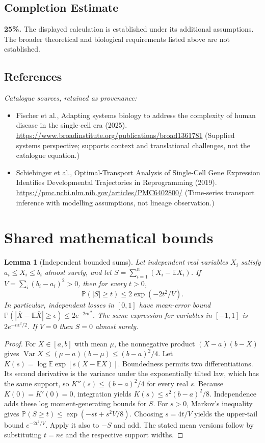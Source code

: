 \documentclass[11pt]{article}
\newcommand{\E}{\mathbb E}
\newcommand{\Prob}{\mathbb P}
\DeclareMathOperator{\Var}{Var}
\providecommand{\E}{\mathbb E}
\providecommand{\Prob}{\mathbb P}
\providecommand{\Var}{\operatorname{Var}}
\newtheorem{sharedlemma}{Lemma}[section]
\begin{document}
\subsection{Completion Estimate}
\textbf{25\%.} The displayed calculation is established under its additional assumptions. The broader theoretical and biological requirements listed above are not established.
\subsection{References}
\noindent\emph{Catalogue sources, retained as provenance:}
\begin{itemize}
\item Fischer et al., Adapting systems biology to address the complexity of human disease in the single-cell era (2025). \url{https://www.broadinstitute.org/publications/broad1361781} (Supplied systems perspective; supports context and translational challenges, not the catalogue equation.)
\item Schiebinger et al., Optimal-Transport Analysis of Single-Cell Gene Expression Identifies Developmental Trajectories in Reprogramming (2019). \url{https://pmc.ncbi.nlm.nih.gov/articles/PMC6402800/} (Time-series transport inference with modelling assumptions, not lineage observation.)
\end{itemize}
\clearpage


\appendix
\section{Shared mathematical bounds}\label{app:bounds}
\begin{sharedlemma}[Independent bounded sums]\label{lem:bounded}
Let independent real variables $X_i$ satisfy $a_i\leq X_i\leq b_i$ almost surely,
and let $S=\sum_{i=1}^n(X_i-\E X_i)$. If
$V=\sum_i(b_i-a_i)^2>0$, then for every $t>0$,
\[
 \Prob(|S|\geq t)\leq 2\exp(-2t^2/V).
\]
In particular, independent losses in $[0,1]$ have mean-error bound
$\Prob(|\overline X-\E\overline X|\geq\epsilon)
\leq2e^{-2n\epsilon^2}$. The same expression for variables in $[-1,1]$
is $2e^{-n\epsilon^2/2}$. If $V=0$ then $S=0$ almost surely.
\end{sharedlemma}
\begin{proof}
For $X\in[a,b]$ with mean $\mu$, the nonnegative product
$(X-a)(b-X)$ gives
$\Var X\leq(\mu-a)(b-\mu)\leq(b-a)^2/4$.
Let $K(s)=\log\E\exp[s(X-\E X)]$.
Boundedness permits two differentiations. Its second derivative is the variance
under the exponentially tilted law, which has the same support, so
$K''(s)\leq(b-a)^2/4$ for every real $s$.
Because $K(0)=K'(0)=0$, integration yields
$K(s)\leq s^2(b-a)^2/8$.
Independence adds these log moment-generating bounds for $S$.
For $s>0$, Markov's inequality gives
$\Prob(S\geq t)\leq\exp(-st+s^2V/8)$.
Choosing $s=4t/V$ yields the upper-tail bound $e^{-2t^2/V}$.
Apply it also to $-S$ and add. The stated mean versions follow by substituting
$t=n\epsilon$ and the respective support widths.
\end{proof}
\end{document}
